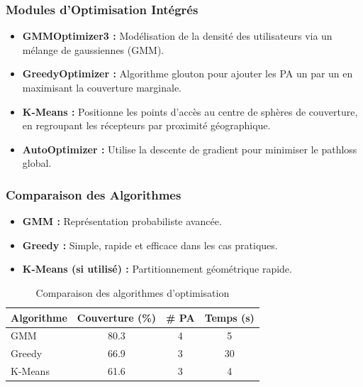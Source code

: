 \documentclass[12pt,a4paper]{article}
\begin{document}
\subsubsection{Modules d’Optimisation Intégrés}

\begin{itemize}
    \item \textbf{GMMOptimizer3 :} Modélisation de la densité des utilisateurs via un mélange de gaussiennes (GMM).
    \item \textbf{GreedyOptimizer :} Algorithme glouton pour ajouter les PA un par un en maximisant la couverture marginale.
   \item \textbf{K-Means :} Positionne les points d’accès au centre de sphères de couverture, en regroupant les récepteurs par proximité géographique.
    \item \textbf{AutoOptimizer :} Utilise la descente de gradient pour minimiser le pathloss global.
\end{itemize}

\subsubsection{Comparaison des Algorithmes}

\begin{itemize}
    \item \textbf{GMM :} Représentation probabiliste avancée.
    \item \textbf{Greedy :} Simple, rapide et efficace dans les cas pratiques.
    \item \textbf{K-Means (si utilisé) :} Partitionnement géométrique rapide.
\end{itemize}

\begin{table}[H]
\centering
\caption{Comparaison des algorithmes d'optimisation}
\begin{tabular}{|l|c|c|c|}
\hline
\textbf{Algorithme} & \textbf{Couverture (\%)} & \textbf{\# PA} & \textbf{Temps (s)} \\
\hline
GMM                  & 80.3                     & 4              & 5                 \\
Greedy               & 66.9                     & 3              & 30                 \\
K-Means              & 61.6                     & 3              & 4                 \\
\hline
\end{tabular}
\end{table}
\end{document}
